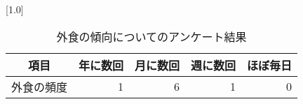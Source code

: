 \begin{table}[H]
\centering
\caption{外食の傾向についてのアンケート結果}
\label{table:questionnaire:frequency}
\small
\scalebox{0.7}[1.0]{
\begin{tabular}{|c|r|r|r|r|}
\hline
項目 & 年に数回 & 月に数回 & 週に数回 & ほぼ毎日 \\ \hline
外食の頻度 & 1 & 6 & 1 & 0 \\ \hline
\end{tabular}
}
\end{table}
